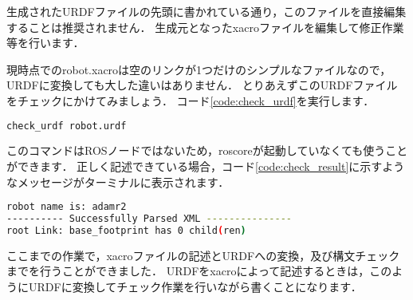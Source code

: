 \documentclass[{../../master}]{subfiles}
\begin{document}
生成されたURDFファイルの先頭に書かれている通り，このファイルを直接編集することは推奨されません．
生成元となった\textsf{xacro}ファイルを編集して修正作業等を行います．

現時点での\textsf{robot.xacro}は空のリンクが1つだけのシンプルなファイルなので，URDFに変換しても大した違いはありません．
とりあえずこのURDFファイルをチェックにかけてみましょう．
コード\ref{code:check_urdf}を実行します．

\begin{lstlisting}[language=sh, caption=Check URDF, label=code:check_urdf]
check_urdf robot.urdf
\end{lstlisting}

このコマンドはROSノードではないため，\textsf{roscore}が起動していなくても使うことができます．
正しく記述できている場合，コード\ref{code:check_result}に示すようなメッセージがターミナルに表示されます．

\begin{lstlisting}[language=sh, caption=Check Result, label=code:check_result]
robot name is: adamr2
---------- Successfully Parsed XML ---------------
root Link: base_footprint has 0 child(ren)
\end{lstlisting}

ここまでの作業で，\textsf{xacro}ファイルの記述とURDFへの変換，及び構文チェックまでを行うことができました．
URDFを\textsf{xacro}によって記述するときは，このようにURDFに変換してチェック作業を行いながら書くことになります．
\end{document}
